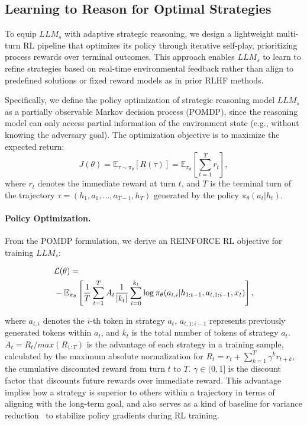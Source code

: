 \subsection{Learning to Reason for Optimal Strategies}

To equip $LLM_s$ with adaptive strategic reasoning, we design a lightweight multi-turn RL pipeline that optimizes its policy through iterative self-play, prioritizing process rewards over terminal outcomes. 
This approach enables $LLM_s$ to learn to refine strategies based on real-time environmental feedback rather than align to predefined solutions or fixed reward models as in prior RLHF methods.

Specifically, we define the policy optimization of strategic reasoning model $LLM_s$ as a partially observable Markov decision process (POMDP), since the reasoning model can only access partial information of the environment state (e.g., without knowing the adversary goal).
The optimization objective is to maximize the expected return:
\begin{equation}
\label{eq:max_reward}
    J(\theta) = \mathbb{E}_{\tau \sim \pi_\theta}[ R(\tau) ]
         = \mathbb{E}_{\pi_\theta}[\sum_{t=1}^{T} r_{t} ],
\end{equation}
where $r_{t}$ denotes the immediate reward at turn $t$, and $T$ is the terminal turn of the trajectory $\tau=(h_1,a_1,...,a_{T-1},h_T)$ generated by the policy $\pi_\theta(a_t|h_t)$.



\paragraph{\textbf{Policy Optimization.}} 
From the POMDP formulation, we derive an REINFORCE RL objective for training $LLM_s$:
\begin{small}
\begin{align}
\label{eq:optimize}
&\mathcal{L}(\theta) = 
\\
&-\mathbb{E}_{\pi_\theta} \left[\frac{1}{T} \sum_{t=1}^{T} A_t \frac{1}{|k_t|}\sum_{i=0}^{k_t} \log \pi_\theta(a_{t,i} |h_{1:t-1}, a_{t,1:i-1},x_t) \right],
\notag
\end{align}
\end{small}
where $a_{t,i}$ denotes the $i$-th token in strategy $a_t$, $a_{t,1:i-1}$ represents previously generated tokens within $a_t$, and $k_t$ is the total number of tokens of strategy $a_t$.
$A_t=R_t/max(R_{1:T})$ is the advantage of each strategy in a training sample, calculated by the maximum absolute normalization for $R_t=r_t + \sum_{k=1}^{T} \gamma^{k} r_{t+k}$, the cumulative discounted reward from turn $t$ to $T$.
$\gamma \in (0,1] $ is the discount factor that discounts future rewards over immediate reward.
This advantage implies how a strategy is superior to others within a trajectory in terms of aligning with the long-term goal, and also serves as a kind of baseline for variance reduction~\cite{Williams2004SimpleSG} to stabilize policy gradients during RL training.


